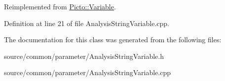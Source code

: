 Reimplemented from \hyperlink{class_picto_1_1_variable_a447e12ef138cdd99ae9ba870ed3b5174}{Picto\-::\-Variable}.



Definition at line 21 of file Analysis\-String\-Variable.\-cpp.



The documentation for this class was generated from the following files\-:\begin{DoxyCompactItemize}
\item 
source/common/parameter/Analysis\-String\-Variable.\-h\item 
source/common/parameter/Analysis\-String\-Variable.\-cpp\end{DoxyCompactItemize}
